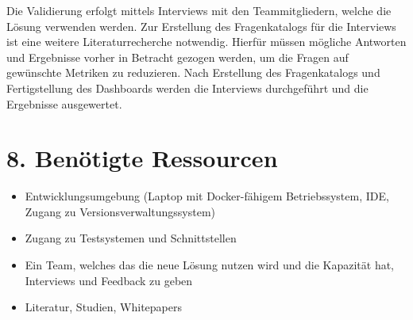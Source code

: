 Die Validierung erfolgt mittels Interviews mit den Teammitgliedern, welche die Lösung verwenden werden. Zur Erstellung des Fragenkatalogs für die Interviews ist eine weitere Literaturrecherche notwendig. Hierfür müssen mögliche Antworten und Ergebnisse vorher in Betracht gezogen werden, um die Fragen auf gewünschte Metriken zu reduzieren. Nach Erstellung des Fragenkatalogs und Fertigstellung des Dashboards werden die Interviews durchgeführt und die Ergebnisse ausgewertet.

\section*{8. Benötigte Ressourcen}
\begin{itemize}
    \item Entwicklungsumgebung (Laptop mit Docker-fähigem Betriebssystem, IDE, Zugang zu Versionsverwaltungssystem)
    \item Zugang zu Testsystemen und Schnittstellen
    \item Ein Team, welches das die neue Lösung nutzen wird und die Kapazität hat, Interviews und Feedback zu geben
    \item Literatur, Studien, Whitepapers

\end{itemize}
